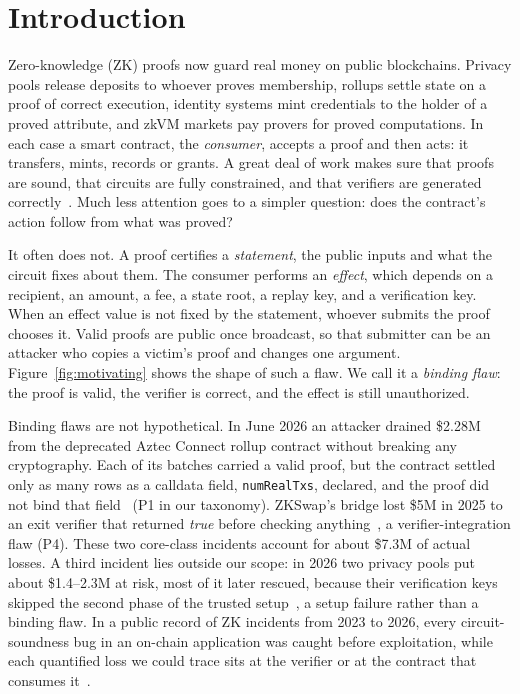 \section{Introduction}\label{sec:intro}

Zero-knowledge (ZK) proofs now guard real money on public blockchains.
Privacy pools release deposits to whoever proves membership, rollups settle
state on a proof of correct execution, identity systems mint credentials to
the holder of a proved attribute, and zkVM markets pay provers for proved
computations. In each case a smart contract, the \emph{consumer}, accepts a
proof and then acts: it transfers, mints, records or grants. A great deal of
work makes sure that proofs are sound, that circuits are fully constrained,
and that verifiers are generated correctly~\cite{sok-snark-bugs,picus,circomspect,zkap}.
Much less attention goes to a simpler question: does the contract's action
follow from what was proved?

It often does not. A proof certifies a \emph{statement}, the public inputs
and what the circuit fixes about them. The consumer performs an \emph{effect},
which depends on a recipient, an amount, a fee, a state root, a replay key,
and a verification key. When an effect value is not fixed by the statement,
whoever submits the proof chooses it. Valid proofs are public once broadcast,
so that submitter can be an attacker who copies a victim's proof and changes
one argument. Figure~\ref{fig:motivating} shows the shape of such a flaw. We
call it a \emph{binding flaw}: the proof is valid, the verifier is correct,
and the effect is still unauthorized.

Binding flaws are not hypothetical. In June 2026 an attacker drained \$2.28M
from the deprecated Aztec Connect rollup contract without breaking any
cryptography. Each of its batches carried a valid proof, but the contract
settled only as many rows as a calldata field, \texttt{numRealTxs}, declared,
and the proof did not bind that field~\cite{aztec-connect-hack} (P1 in our
taxonomy). ZKSwap's bridge lost \$5M in 2025 to an exit verifier that
returned \emph{true} before checking anything~\cite{zkswap-hack}, a
verifier-integration flaw (P4). These two core-class incidents account for
about \$7.3M of actual losses. A third incident lies outside our scope: in
2026 two privacy pools put about \$1.4--2.3M at risk, most of it later
rescued, because their verification keys skipped the second phase of the
trusted setup~\cite{groth16-setup-exploit,rekt-foom}, a setup failure rather
than a binding flaw. In a public record of ZK incidents from 2023 to 2026,
every circuit-soundness bug in an on-chain application was caught before
exploitation, while each quantified loss we could trace sits at the verifier
or at the contract that consumes it~\cite{zkp-hacks-record}.

